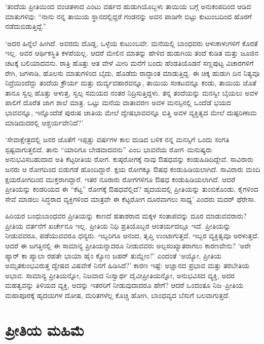 ‘ತಂದೆಯ ಪ್ರೀತಿಯಿಂದ ವಂಚಿತಳಾದ ಎಂಟು ವರ್ಷದ ಹುಡುಗಿಯೊಬ್ಬಳು ತಾಯಿಯ ಬಗ್ಗೆ ಅನುಕಂಪದಿಂದ ಆಡಿದ ಮಾತುಗಳಿವು: “ನಾನು ನನ್ನ ತಾಯಿಯ ಸ್ಥಾನದಲ್ಲಿದ್ದರೆ ಗಂಡನನ್ನು ಅವನ ಪಾಡಿಗೇ ಬಿಟ್ಟು ಕುಟುಂಬದಿಂದ ಹೊರಗೆ ನಡೆದುಬಿಡುತ್ತಿದ್ದೆ.”

‘ಅದರ ಹಿನ್ನೆಲೆ ಹೀಗಿದೆ. ಅವರದು ದೊಡ್ಡ, ಒಳ್ಳೆಯ ಕುಟುಂಬವೇ. ಮನೆಯಲ್ಲಿ ಬಾಂಧವರು ಆಳುಕಾಳುಗಳಿಗೆ ಕೊರತೆ ಇಲ್ಲ. ಅವರ ಆರ್ಥಿಕಸ್ಥಿತಿ ಕಳಪೆಯಲ್ಲ. ಆದರೆ ಮೇಲಿನ ಮಾತನ್ನು ಹೇಳಿದ ಹುಡುಗಿಯ ತಂದೆ ಕುಡಿತ ಮತ್ತು ಜೂಜಿನ ಚಟಕ್ಕೆ ಬಲಿಯಾದವನು. ರಾತ್ರಿ ಹೊತ್ತು ಆತ ವೇಳೆ ಮೀರಿ ಮನೆಗೆ ಬಂದು ಹೆಂಡತಿಯೊಡನೆ ಸಣ್ಣಪುಟ್ಟ ವಿಚಾರಗಳಿಗೆ ರೇಗಿ, ಜಗಳಾಡಿ, ಹೊಲಸು ಮಾತುಗಳಿಂದ ಬೈದು, ಹೊಡೆದು ರಾದ್ಧಾಂತ ಮಾಡುತ್ತಿದ್ದ. ಈ ಚಿಕ್ಕ ಹುಡುಗಿ ದಿನ ನಿತ್ಯವೂ ನಿದ್ರೆಯಿಂದೆದ್ದು ತಂದೆಯ ಕ್ರೌರ್ಯ ಮತ್ತು ದುರ್ವ್ಯವಹಾರವನ್ನೂ, ತಾಯಿಯ ಸಂಕಟವನ್ನೂ ಕಂಡು, ತಾಯಿಯ ಜೊತೆ ತಾನೂ ಸ್ವಲ್ಪ ಹೊತ್ತು ಅಳುತ್ತ, ಸ್ವಲ್ಪ ಸಮಯದ ನಂತರ ನಿದ್ರಿಸುತ್ತಿದ್ದಳು. ತನ್ನ ತಂದೆಯನ್ನು ಮನಸ್ವೀ ಬೈಯಲು ಅವಳ ಪಾಲಿಗೆ ದೊರೆತ ಜಾಗ ಶಾಲೆ ಮಾತ್ರ. ಒಟ್ಟು ಮನೆಯ ವಾತಾವರಣ ಅವಳ ಮನಸ್ಸಿನಲ್ಲಿ ಒಂದೆಡೆ ಭಯದ ಭಾವವನ್ನೂ, ಇನ್ನೊಂದೆಡೆ ಪುರುಷ ಜಾತಿಯ ಮೇಲೆ ದ್ವೇಷಭಾವವನ್ನೂ ಬಿತ್ತಿ ಅವಳ ವ್ಯಕ್ತಿತ್ವದ ಮೇಲೆ ದುಷ್ಪರಿಣಾಮ ಮಾಡಿದುದರಲ್ಲಿ ಆಶ್ಚರ್ಯವೇನಿದೆ?’

‘ಸೇವಾಕ್ಷೇತ್ರದಲ್ಲಿ ಜನರ ಜೊತೆಗೆ ಇಪ್ಪತ್ತು ವರ್ಷಗಳ ಕಾಲ ದುಡಿದ ಬಳಿಕ ನನ್ನ ಮನಸ್ಸಿಗೆ ಒಂದು ಸಂಗತಿ ಸ್ಪಷ್ಟವಾಗುತ್ತಲಿದೆ. ತಾನು “ಯಾರಿಗೂ ಬೇಡವಾದವನು” ಎಂಬ ಭಾವನೆಯ ರೋಗ–ಮನುಷ್ಯರು ಅನುಭವಿಸಬಹುದಾದ ಅತಿ ಕೆಟ್ಟರೀತಿಯ ರೋಗ. ಕುಷ್ಠರೋಗಕ್ಕೆ ನಾವು ಔಷಧವನ್ನು ಕಂಡುಹಿಡಿದಿದ್ದೇವೆ. ಸಾವಿರಾರು ಜನರು ಆ ರೋಗದಿಂದ ಬಿಡುಗಡೆ ಹೊಂದಿದ್ದಾರೆ. ಕ್ಷಯ ರೋಗಕ್ಕೂ ಔಷಧ ಕಂಡುಹಿಡಿಯಲಾಗಿದೆ. ಸಾವಿರಾರು ಮಂದಿ ಕ್ಷಯರೋಗದಿಂದ ಮುಕ್ತರಾಗಿದ್ದಾರೆ. ಇತರ ನೂರಾರು ರೋಗಗಳಿಗೂ ಔಷಧ ಕಂಡುಹಿಡಿಯಲಾಗಿದೆ. ಆದರೆ ಪ್ರೀತಿಯನ್ನು ಕಂಡರಿಯದ ಈ “ಕೆಟ್ಟ” ರೋಗಕ್ಕೆ ಔಷಧವೆಲ್ಲಿದೆ? ಹೃದಯದಲ್ಲಿ ಪ್ರೀತಿಯನ್ನು ತುಂಬಿಕೊಂಡು, ಕೈಗಳಿಂದ ಸೇವೆ ಮಾಡಲು ಸಿದ್ಧರಾದ ವ್ಯಕ್ತಿಗಳಿಂದ ಮಾತ್ರವೇ ಈ ಕೆಟ್ಟರೋಗ ದೂರವಾಗಲು ಸಾಧ್ಯ’ ಎಂದರು ಮದರ್ ಥೆರೇಸಾ.

ಹಿರಿಯರ ಬಂಧುಬಾಂಧವರ ಪ್ರೀತಿಯನ್ನು ಕಾಣದೆ ಹತಾಶರಾದ ಮಕ್ಕಳ ಸಂತಾಪವನ್ನು ದೂರ ಮಾಡುವವರಾರು? ಪ್ರೀತಿಯ ವರ್ತನೆಗೆ ಖರ್ಚೇನೂ ಇಲ್ಲ. ಪ್ರೀತಿಯ ನಿಧಿ ಪ್ರತಿಯೊಬ್ಬರ ಆಂತರ್ಯದಲ್ಲೂ ಇದೆ. ಪ್ರೀತಿಯನ್ನು ನೀಡುವವರೂ, ಪಡೆಯುವವರೂ ಧನ್ಯರು. ಇಬ್ಬರಿಗೂ ಆನಂದ, ತೃಪ್ತಿ ಉಂಟಾಗುತ್ತದೆ. ಇಬ್ಬರ ವ್ಯಕ್ತಿತ್ವವೂ ಅರಳುತ್ತದೆ. ಆದರೆ ಈ ಜಗತ್ತಿನಲ್ಲಿ ಈ ಸಾಮಾನ್ಯ ಪ್ರೀತಿಯನ್ನಾದರೂ ನೀಡುವವರು ಅಲ್ಪಸಂಖ್ಯಾತರಾಗಲು ಕಾರಣವೇನು? ‘ಅರೇ ಪ್ಯಾರ್ ಕಾ ಪ್ಯಾಲಾ ರಹತೇ ಭಾಯಾ ಹೈಂ ಕ್ಯೋಂ ಜಹರ್ ತುಮ್ಹೇಂ?’ ಎಂದಂತೆ ‘ಅಯ್ಯೋ, ಪ್ರೀತಿಯ ಅಮೃತಕುಂಭವಿರುತ್ತ ದ್ವೇಷದ ವಿಷವೇಕೆ ನಿನಗೆ ಹಿಡಿಸಿದೆ?’ ಕಾರಣ ಇಷ್ಟೆ: ಅಜ್ಞಾನದ ಪ್ರಭಾವ ಮತ್ತು ತರಬೇತಿಯ ಅಭಾವ. ಸಾಮಾನ್ಯ ಪ್ರೀತಿಯನ್ನೋ, ನಿಜವಾದ ನಿಃಸ್ವಾರ್ಥ ದೈವೀಪ್ರೀತಿಯನ್ನೋ, ಅನುಭವಿಸದ ವ್ಯಕ್ತಿ, ಅದರ ಮಹತ್ವವನ್ನು ತಿಳಿಯದ ವ್ಯಕ್ತಿ, ಅದನ್ನು ಇತರರಿಗೆ ನೀಡುವುದಾದರೂ ಹೇಗೆ? ಆದರೆ ಒಂದಂತೂ ನಿಜ–ಪ್ರೀತಿಯ ಮಹಾಪೂರಕ್ಕೆ ಹೃದಯಗಳ ದೋಷ, ದುರಿತಗಳೆಲ್ಲ ಕೊಚ್ಚಿ ಹೋಗಿ, ಬಾಂಧವ್ಯದ ಬೆಸುಗೆ ಬಲವಾಗುತ್ತದೆ.


\section*{ಪ್ರೀತಿಯ ಮಹಿಮೆ}

